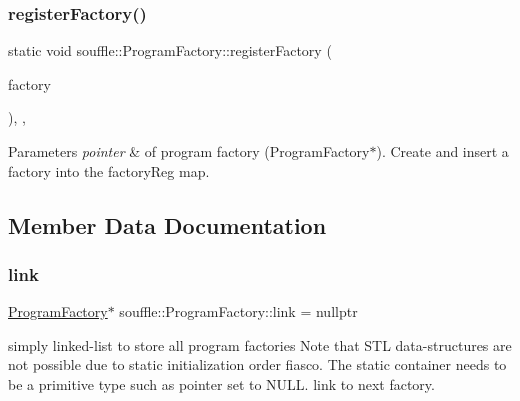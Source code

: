 \subsubsection{\texorpdfstring{register\+Factory()}{registerFactory()}}
{\footnotesize\ttfamily static void souffle\+::\+Program\+Factory\+::register\+Factory (\begin{DoxyParamCaption}\item[{\hyperlink{classsouffle_1_1_program_factory}{Program\+Factory} $\ast$}]{factory }\end{DoxyParamCaption})\hspace{0.3cm}{\ttfamily [inline]}, {\ttfamily [static]}, {\ttfamily [protected]}}


\begin{DoxyParams}{Parameters}
{\em pointer} & of program factory (Program\+Factory$\ast$). Create and insert a factory into the factory\+Reg map. \\
\hline
\end{DoxyParams}


\subsection{Member Data Documentation}
\mbox{\label{classsouffle_1_1_program_factory_ac080f0c3db8b720c3c3b47935f75bd17}} 
\subsubsection{\texorpdfstring{link}{link}}
{\footnotesize\ttfamily \hyperlink{classsouffle_1_1_program_factory}{Program\+Factory}$\ast$ souffle\+::\+Program\+Factory\+::link = nullptr\hspace{0.3cm}{\ttfamily [protected]}}

simply linked-\/list to store all program factories Note that S\+TL data-\/structures are not possible due to static initialization order fiasco. The static container needs to be a primitive type such as pointer set to N\+U\+LL. link to next factory. \mbox{\label{classsouffle_1_1_program_factory_a9dc30a356790b8543aa5dbf285eca4da}} 
